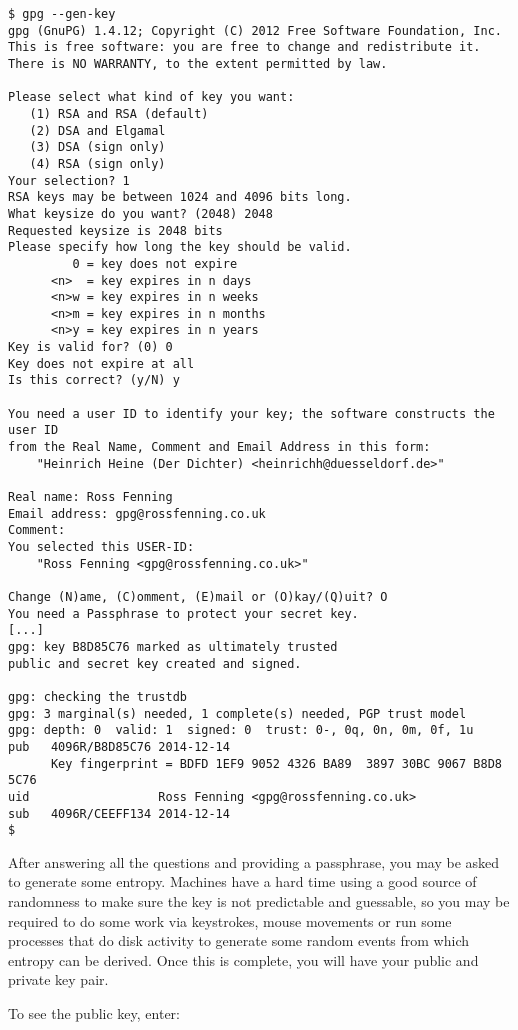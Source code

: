\documentclass{report}
\begin{document}
\begin{lstlisting}
$ gpg --gen-key
gpg (GnuPG) 1.4.12; Copyright (C) 2012 Free Software Foundation, Inc.
This is free software: you are free to change and redistribute it.
There is NO WARRANTY, to the extent permitted by law.

Please select what kind of key you want:
   (1) RSA and RSA (default)
   (2) DSA and Elgamal
   (3) DSA (sign only)
   (4) RSA (sign only)
Your selection? 1
RSA keys may be between 1024 and 4096 bits long.
What keysize do you want? (2048) 2048
Requested keysize is 2048 bits
Please specify how long the key should be valid.
         0 = key does not expire
      <n>  = key expires in n days
      <n>w = key expires in n weeks
      <n>m = key expires in n months
      <n>y = key expires in n years
Key is valid for? (0) 0
Key does not expire at all
Is this correct? (y/N) y

You need a user ID to identify your key; the software constructs the user ID
from the Real Name, Comment and Email Address in this form:
    "Heinrich Heine (Der Dichter) <heinrichh@duesseldorf.de>"

Real name: Ross Fenning
Email address: gpg@rossfenning.co.uk
Comment:
You selected this USER-ID:
    "Ross Fenning <gpg@rossfenning.co.uk>"

Change (N)ame, (C)omment, (E)mail or (O)kay/(Q)uit? O
You need a Passphrase to protect your secret key.
[...]
gpg: key B8D85C76 marked as ultimately trusted
public and secret key created and signed.

gpg: checking the trustdb
gpg: 3 marginal(s) needed, 1 complete(s) needed, PGP trust model
gpg: depth: 0  valid: 1  signed: 0  trust: 0-, 0q, 0n, 0m, 0f, 1u
pub   4096R/B8D85C76 2014-12-14
      Key fingerprint = BDFD 1EF9 9052 4326 BA89  3897 30BC 9067 B8D8 5C76
uid                  Ross Fenning <gpg@rossfenning.co.uk>
sub   4096R/CEEFF134 2014-12-14
$
\end{lstlisting}

After answering all the questions and providing a passphrase,
you may be asked to generate some entropy.
Machines have a hard time using a good source of randomness to make sure
the key is not predictable and guessable, so you may be required to do
some work via keystrokes, mouse movements or run some processes that
do disk activity to generate some random events from which entropy
can be derived. Once this is complete, you will have your public and
private key pair.

To see the public key, enter:
\end{document}
